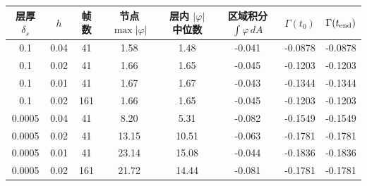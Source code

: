 \begin{tabular}{cccccccc}\toprule 层厚 $\delta_s$ & $h$ & 帧数 & 节点 $\max|\varphi|$ & 层内 $|\varphi|$ 中位数 & 区域积分 $\int\varphi\,dA$ & $\Gamma(t_0)$ & $\Gamma(t_{\rm end})$\\\midrule
0.1 & 0.04 & 41 & 1.58 & 1.48 & -0.041 & -0.0878 & -0.0878\\
0.1 & 0.02 & 41 & 1.66 & 1.65 & -0.045 & -0.1203 & -0.1203\\
0.1 & 0.01 & 41 & 1.67 & 1.67 & -0.043 & -0.1344 & -0.1344\\
0.1 & 0.02 & 161 & 1.66 & 1.65 & -0.045 & -0.1203 & -0.1203\\
0.0005 & 0.04 & 41 & 8.20 & 5.31 & -0.082 & -0.1549 & -0.1549\\
0.0005 & 0.02 & 41 & 13.15 & 10.51 & -0.063 & -0.1781 & -0.1781\\
0.0005 & 0.01 & 41 & 23.14 & 15.08 & -0.044 & -0.1836 & -0.1836\\
0.0005 & 0.02 & 161 & 21.72 & 14.44 & -0.081 & -0.1781 & -0.1781\\
\bottomrule\end{tabular}